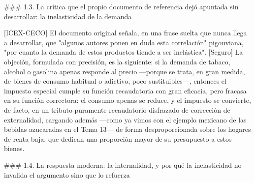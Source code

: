 \documentclass[10pt,a4paper]{article}
\begin{document}
### 1.3. La crítica que el propio documento de referencia dejó apuntada sin desarrollar: la inelasticidad de la demanda

[ICEX-CECO] El documento original señala, en una frase suelta que nunca llega a desarrollar, que "algunos autores ponen en duda esta correlación" pigouviana, "por cuanto la demanda de estos productos tiende a ser inelástica". [Seguro] La objeción, formulada con precisión, es la siguiente: si la demanda de tabaco, alcohol o gasolina apenas responde al precio —porque se trata, en gran medida, de bienes de consumo habitual o adictivo, poco sustituibles—, entonces el impuesto especial cumple su función recaudatoria con gran eficacia, pero fracasa en su función correctora: el consumo apenas se reduce, y el impuesto se convierte, de facto, en un tributo puramente recaudatorio disfrazado de corrección de externalidad, cargando además —como ya vimos con el ejemplo mexicano de las bebidas azucaradas en el Tema 13— de forma desproporcionada sobre los hogares de renta baja, que dedican una proporción mayor de su presupuesto a estos bienes.

### 1.4. La respuesta moderna: la internalidad, y por qué la inelasticidad no invalida el argumento sino que lo refuerza
\end{document}
